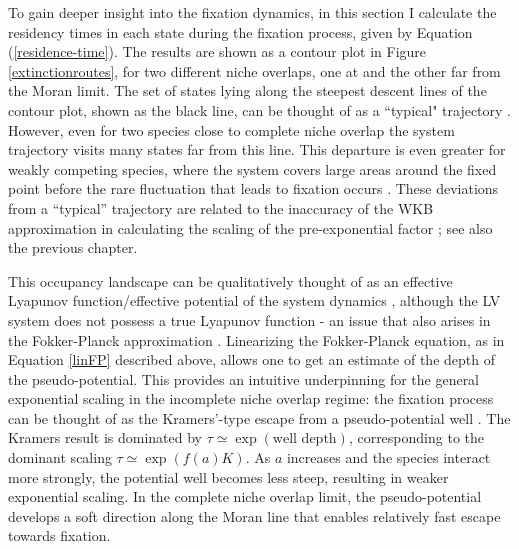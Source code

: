 To gain deeper insight into the fixation dynamics, in this section I calculate the residency times in each state during the fixation process, given by Equation (\ref{residence-time}). %
The results are shown as a contour plot in Figure \ref{extinctionroutes},
for two different niche overlaps, one at and the other far from the Moran limit. The set of states lying along the steepest descent lines of the contour plot, shown as the black line, can be thought of as a ``typical" trajectory \cite{Gabel2013,Matkowsky1984,Kessler2007}. 
However, even for two species close to complete niche overlap the system trajectory visits many states far from this line. 
This departure is even greater for weakly competing species, where the system covers large areas around the fixed point before the rare fluctuation that leads to fixation occurs \cite{Gottesman2012}. 
These deviations from a ``typical'' trajectory are related to the inaccuracy of the WKB approximation in calculating the scaling of the pre-exponential factor \cite{Assaf2016,Gottesman2012,Lande1993}; see also the previous chapter. %

This occupancy landscape can be qualitatively thought of as an effective Lyapunov function/effective potential of the system dynamics \cite{Zhou2012}, although the LV system does not possess a true Lyapunov function - an issue that also arises in the Fokker-Planck approximation \cite{Zhou2012,Chotibut2015}. 
Linearizing the Fokker-Planck equation, as in Equation \ref{linFP} described above, allows one to get an estimate of the depth of the pseudo-potential. %
This provides an intuitive underpinning for the general exponential scaling in the incomplete niche overlap regime: the fixation process can be thought of as the Kramers'-type escape from a pseudo-potential well \cite{Berglund2011}. 
The Kramers result is dominated by $\tau \simeq \exp(\text{well depth})$, corresponding to the dominant scaling $\tau \simeq \exp(f(a)K)$. 
As $a$ increases and the species interact more strongly, the potential well becomes less steep, resulting in weaker exponential scaling. 
In the complete niche overlap limit, the pseudo-potential develops a soft direction along the Moran line that enables relatively fast escape towards fixation.

